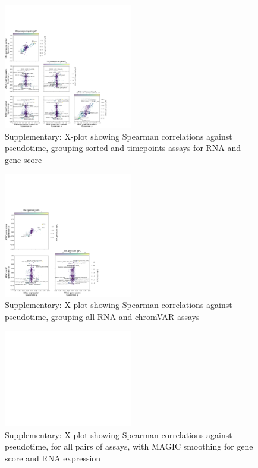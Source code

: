 \documentclass[a4paper]{article}
\begin{document}
\begin{figure}[!htb]
  \centering
  \includegraphics[width=0.5\textwidth]{../figures/hematopoiesis/MKP_40_110_smooth_none_semi_detailed_X_plot.png}
  \caption{Supplementary: X-plot showing Spearman correlations against pseudotime, grouping sorted and timepoints assays for RNA and gene score}
\end{figure}

\begin{figure}[!htb]
  \centering
  \includegraphics[width=0.5\textwidth]{../figures/hematopoiesis/MKP_40_110_smooth_none_grouped_X_plot.png}
  \caption{Supplementary: X-plot showing Spearman correlations against pseudotime, grouping all RNA and chromVAR assays}
\end{figure}


\begin{figure}[!htb]
  \centering
  \includegraphics[width=0.5\textwidth]{../figures/hematopoiesis/MKP_40_110_smooth_magic_detailed_X_plot.png}
  \caption{Supplementary: X-plot showing Spearman correlations against pseudotime, for all pairs of assays, with MAGIC smoothing for gene score and RNA expression}
\end{figure}
\end{document}
